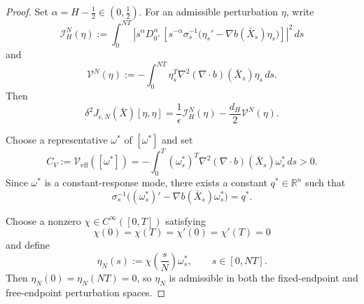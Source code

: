 \documentclass[10pt,a4paper]{amsart}
\begin{document}
\begin{proof}
Set $\alpha=H-\frac12\in(0,\frac12)$. For an admissible perturbation
$\eta$, write
\begin{equation}
\label{eq:IHN-def-H-greater-half}
    \mathcal I_H^N(\eta)
    :=
    \int_0^{NT}
    \left|
        s^\alpha D_{0^+}^{\alpha}
        \left[
            s^{-\alpha}\sigma_s^{-1}
            \bigl(
                \eta_s'
                -
                \nabla b(\bar X_s)\eta_s
            \bigr)
        \right]
    \right|^2\,ds
\end{equation}
and
\begin{equation}
\label{eq:VN-def-H-greater-half}
    \mathcal V^N(\eta)
    :=
    -
    \int_0^{NT}
    \eta_s^T
    \nabla^2(\nabla\!\cdot b)(\bar X_s)
    \eta_s\,ds.
\end{equation}
Then
\begin{equation*}
    \delta^2J_{\epsilon,N}(\bar X)[\eta,\eta]
    =
    \frac1\epsilon\mathcal I_H^N(\eta)
    -
    \frac{d_H}{2}\mathcal V^N(\eta).
\end{equation*}

Choose a representative $\omega^*$ of $[\omega^*]$ and set
\begin{equation}
\label{eq:positive-Veff}
    C_V
    :=
    \mathcal V_{\mathrm{eff}}([\omega^*])
    =
    -
    \int_0^T
    (\omega_s^*)^T
    \nabla^2(\nabla\!\cdot b)(\bar X_s)
    \omega_s^*\,ds
    >
    0.
\end{equation}
Since $\omega^*$ is a constant-response mode, there exists a constant
$q^*\in\mathbb R^n$ such that
\begin{equation}
\label{eq:constant-response-selected}
    \sigma_s^{-1}
    \bigl(
        (\omega_s^*)'
        -
        \nabla b(\bar X_s)\omega_s^*
    \bigr)
    =
    q^*.
\end{equation}

Choose a nonzero $\chi\in C^\infty([0,T])$ satisfying
\begin{equation*}
    \chi(0)=\chi(T)=\chi'(0)=\chi'(T)=0
\end{equation*}
and define
\begin{equation}
\label{eq:test-variation-etaN}
    \eta_N(s)
    :=
    \chi\left(\frac{s}{N}\right)\omega_s^*,
    \qquad
    s\in[0,NT].
\end{equation}
Then $\eta_N(0)=\eta_N(NT)=0$, so $\eta_N$ is admissible in both the
fixed-endpoint and free-endpoint perturbation spaces.


\end{proof}
\end{document}
